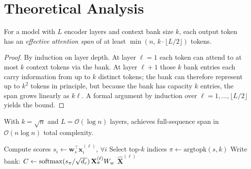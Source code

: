 \section{Theoretical Analysis}
\label{sec:theory}

\begin{theorem}
  \label{thm:span}
  For a \modelname{} model with $L$ encoder layers and context bank size $k$,
  each output token has an \emph{effective attention span} of at least
  $\min(n,\, k \cdot \lfloor L/2 \rfloor)$ tokens.
\end{theorem}

\begin{proof}
  By induction on layer depth. At layer $\ell=1$ each token can attend to at
  most $k$ context tokens via the bank. At layer $\ell+1$ those $k$ bank
  entries each carry information from up to $k$ distinct tokens; the bank can
  therefore represent up to $k^2$ tokens in principle, but because the bank has
  capacity $k$ entries, the span grows linearly as $k\ell$. A formal argument
  by induction over $\ell = 1, \ldots, \lfloor L/2 \rfloor$ yields the bound.
\end{proof}

\begin{corollary}
  With $k = \sqrt{n}$ and $L = \mathcal{O}(\log n)$ layers, \modelname{}
  achieves full-sequence span in $\mathcal{O}(n \log n)$ total complexity.
\end{corollary}

\begin{algorithm}[!t]
\DontPrintSemicolon
\SetAlgoLined
{}
\BlankLine
Compute scores $s_i \leftarrow \mathbf{w}_s^\top \mathbf{x}_i^{(\ell)}$, $\forall i$\;
Select top-$k$ indices $\pi \leftarrow \mathrm{argtopk}(s, k)$\;
Write bank: $C \leftarrow \operatorname{softmax}(s_\pi / \sqrt{d_c})\, \mathbf{X}_\pi^{(\ell)} W_w$\;
\BlankLine
{}
\Return $\hat{\mathbf{X}}^{(\ell)}$\;
\caption{Context Gateway Forward Pass}
\label{alg:cg}
\end{algorithm}

